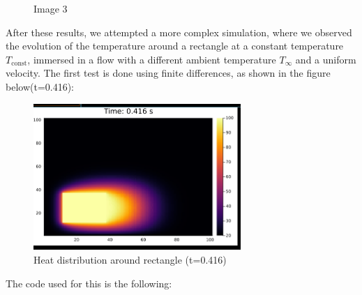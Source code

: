\begin{figure}[h!]
\begin{minipage}[b]{0.3\textwidth}
        \caption{Image 3}
    \end{minipage}
\end{figure}



After these results, we attempted a more complex simulation, where we observed the evolution of the temperature around a rectangle at a constant temperature $T_{\text{const}}$, immersed in a flow with a different ambient temperature $T_{\infty}$ and a uniform velocity. The first test is done using finite differences, as shown in the figure below(t=0.416):


\begin{figure}[H]
    \centering
    \includegraphics[width=0.7\textwidth]{Figures/rect2.png}
    \caption{Heat distribution around rectangle (t=0.416)}
    \label{fig:etiqueta_figure}
\end{figure}

\newpage 
The code used for this is the following:


